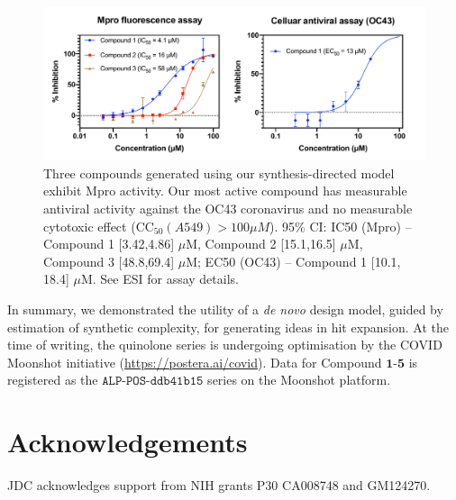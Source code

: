 \documentclass[twoside,twocolumn,9pt]{article}
\begin{document}
\begin{figure}
\centering
         \includegraphics[scale=0.36]{data_curve.pdf}
    \caption{Three compounds generated using our synthesis-directed model exhibit Mpro activity. Our most active compound has measurable antiviral activity against the OC43 coronavirus and no measurable cytotoxic effect ($\mathrm{CC}_{50} (A549)>100 \mu M$). 95\% CI: IC50 (Mpro) -- Compound 1 [3.42,4.86] $\mu$M, Compound 2 [15.1,16.5] $\mu$M, Compound 3 [48.8,69.4] $\mu$M; EC50 (OC43) -- Compound 1 [10.1, 18.4] $\mu$M. See ESI for assay details.}
    \label{fig:data}
\end{figure}

In summary, we demonstrated the utility of a \emph{de novo} design model, guided by estimation of synthetic complexity, for generating ideas in hit expansion. At the time of writing, the quinolone series is undergoing optimisation by the COVID Moonshot initiative (\url{https://postera.ai/covid}). Data for Compound $\mathbf{1}$-$\mathbf{5}$ is registered as the $\texttt{ALP-POS-ddb41b15}$ series on the Moonshot platform. 




\section*{Acknowledgements}
JDC acknowledges support from NIH grants P30 CA008748 and GM124270. 
\end{document}
